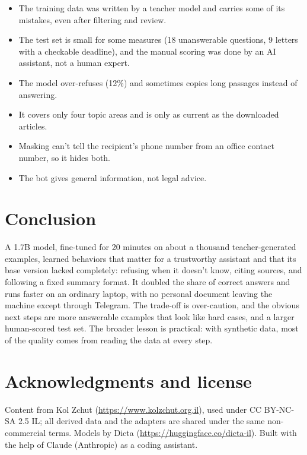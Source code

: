 \documentclass[11pt]{article}
\begin{document}
\begin{itemize}
\item The training data was written by a teacher model and carries some of its mistakes, even after filtering and review.
\item The test set is small for some measures (18 unanswerable questions, 9 letters with a checkable deadline), and the manual scoring was done by an AI assistant, not a human expert.
\item The model over-refuses (12\%) and sometimes copies long passages instead of answering.
\item It covers only four topic areas and is only as current as the downloaded articles.
\item Masking can't tell the recipient's phone number from an office contact number, so it hides both.
\item The bot gives general information, not legal advice.
\end{itemize}

\section{Conclusion}

A 1.7B model, fine-tuned for 20 minutes on about a thousand teacher-generated examples, learned behaviors that matter for a trustworthy assistant and that its base version lacked completely: refusing when it doesn't know, citing sources, and following a fixed summary format. It doubled the share of correct answers and runs faster on an ordinary laptop, with no personal document leaving the machine except through Telegram. The trade-off is over-caution, and the obvious next steps are more answerable examples that look like hard cases, and a larger human-scored test set. The broader lesson is practical: with synthetic data, most of the quality comes from reading the data at every step.

\section*{Acknowledgments and license}

Content from Kol Zchut (\url{https://www.kolzchut.org.il}), used under CC BY-NC-SA 2.5 IL; all derived data and the adapters are shared under the same non-commercial terms. Models by Dicta (\url{https://huggingface.co/dicta-il}). Built with the help of Claude (Anthropic) as a coding assistant.
\end{document}
